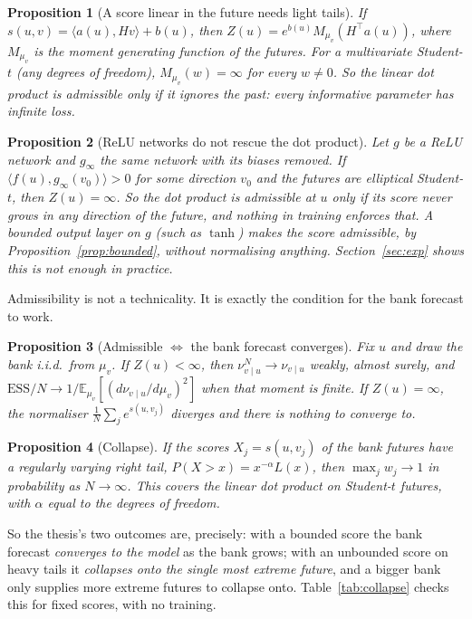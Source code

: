 \documentclass[11pt]{article}
\newcommand{\E}{\mathbb{E}}
\newcommand{\vu}{{v\mid u}}
\theoremstyle{plain}
\newtheorem{proposition}{Proposition}
\theoremstyle{definition}
\theoremstyle{remark}
\begin{document}
\begin{proposition}[A score linear in the future needs light tails]\label{prop:linear}
If $s(u,v)=\langle a(u),Hv\rangle+b(u)$, then $Z(u)=e^{b(u)}M_{\mu_v}(H^\top a(u))$, where $M_{\mu_v}$ is the
moment generating function of the futures. For a multivariate Student-$t$ (any degrees of
freedom), $M_{\mu_v}(w)=\infty$ for every $w\ne0$. So the linear dot product is admissible only
if it ignores the past: every informative parameter has infinite loss.
\end{proposition}

\begin{proposition}[ReLU networks do not rescue the dot product]\label{prop:relu}
Let $g$ be a ReLU network and $g_\infty$ the same network with its biases removed. If
$\langle f(u),g_\infty(v_0)\rangle>0$ for some direction $v_0$ and the futures are elliptical
Student-$t$, then $Z(u)=\infty$. So the dot product is admissible at $u$ only if its score never
grows in any direction of the future, and nothing in training enforces that. A bounded output
layer on $g$ (such as $\tanh$) makes the score admissible, by Proposition~\ref{prop:bounded},
without normalising anything. Section~\ref{sec:exp} shows this is not enough in practice.
\end{proposition}

Admissibility is not a technicality. It is exactly the condition for the bank forecast to
work.

\begin{proposition}[Admissible $\Leftrightarrow$ the bank forecast converges]\label{prop:snis}
Fix $u$ and draw the bank i.i.d.\ from $\mu_v$. If $Z(u)<\infty$, then $\nu^N_\vu\to\nu_\vu$ weakly,
almost surely, and $\mathrm{ESS}/N\to1/\E_{\mu_v}[(d\nu_\vu/d\mu_v)^2]$ when that moment is finite.
If $Z(u)=\infty$, the normaliser $\frac1N\sum_j e^{s(u,v_j)}$ diverges and there is nothing to
converge to.
\end{proposition}

\begin{proposition}[Collapse]\label{prop:collapse}
If the scores $X_j=s(u,v_j)$ of the bank futures have a regularly varying right tail,
$P(X>x)=x^{-\alpha}L(x)$, then $\max_jw_j\to1$ in probability as $N\to\infty$. This covers the linear
dot product on Student-$t$ futures, with $\alpha$ equal to the degrees of freedom.
\end{proposition}

So the thesis's two outcomes are, precisely: with a bounded score the bank forecast
\emph{converges to the model} as the bank grows; with an unbounded score on heavy tails it
\emph{collapses onto the single most extreme future}, and a bigger bank only supplies more
extreme futures to collapse onto. Table~\ref{tab:collapse} checks this for fixed scores, with
no training.
\end{document}
